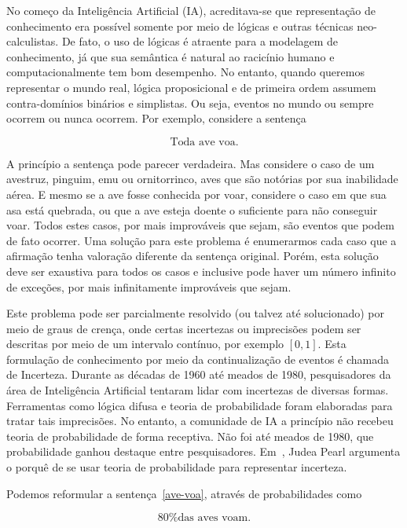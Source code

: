 \documentclass{amsart}
\theoremstyle{plain}
\numberwithin{equation}{subsection}
\begin{document}
No começo da Inteligência Artificial (IA), acreditava-se que representação de conhecimento era
possível somente por meio de lógicas e outras técnicas neo-calculistas. De fato, o uso de lógicas é
atraente para a modelagem de conhecimento, já que sua semântica é natural ao racicínio humano e
computacionalmente tem bom desempenho. No entanto, quando queremos representar o mundo real, lógica
proposicional e de primeira ordem assumem contra-domínios binários e simplistas. Ou seja, eventos
no mundo ou sempre ocorrem ou nunca ocorrem. Por exemplo, considere a sentença

\begin{equation}\label{ave-voa}
  \text{Toda ave voa.}
\end{equation}

A princípio a sentença pode parecer verdadeira. Mas considere o caso de um avestruz, pinguim, emu
ou ornitorrinco, aves que são notórias por sua inabilidade aérea. E mesmo se a ave fosse conhecida
por voar, considere o caso em que sua asa está quebrada, ou que a ave esteja doente o suficiente
para não conseguir voar. Todos estes casos, por mais improváveis que sejam, são eventos que podem
de fato ocorrer. Uma solução para este problema é enumerarmos cada caso que a afirmação tenha
valoração diferente da sentença original. Porém, esta solução deve ser exaustiva para todos os
casos e inclusive pode haver um número infinito de exceções, por mais infinitamente improváveis que
sejam.

Este problema pode ser parcialmente resolvido (ou talvez até solucionado) por meio de graus de
crença, onde certas incertezas ou imprecisões podem ser descritas por meio de um intervalo
contínuo, por exemplo $[0,1]$. Esta formulação de conhecimento por meio da continualização de
eventos é chamada de Incerteza. Durante as décadas de 1960 até meados de 1980, pesquisadores da
área de Inteligência Artificial tentaram lidar com incertezas de diversas formas. Ferramentas como
lógica difusa e teoria de probabilidade foram elaboradas para tratar tais imprecisões. No entanto,
a comunidade de IA a princípio não recebeu teoria de probabilidade de forma receptiva. Não foi até
meados de 1980, que probabilidade ganhou destaque entre pesquisadores. Em~\cite{pearl-1988}, Judea
Pearl argumenta o porquê de se usar teoria de probabilidade para representar incerteza.

Podemos reformular a sentença~\ref{ave-voa}, através de probabilidades como

\begin{equation}
  \text{80\% das aves voam.}
\end{equation}
\end{document}
